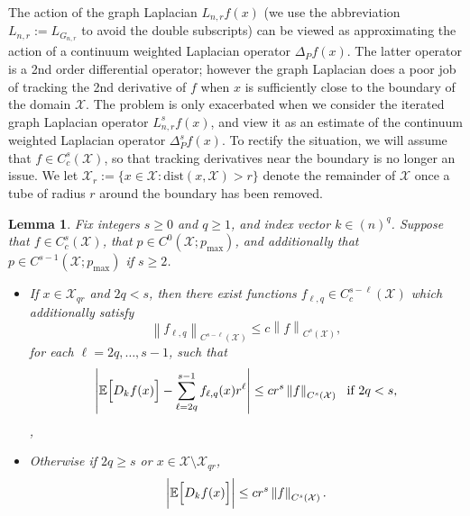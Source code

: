 \documentclass{article}
\newcommand{\abs}[1]{\left \lvert #1 \right \rvert}
\newcommand{\norm}[1]{\left \lVert #1 \right \rVert}
\newcommand{\1}{\mathbf{1}}
\newcommand{\Xset}{\mathcal{X}}
\newcommand{\Ebb}{\mathbb{E}}
\newcommand{\dist}{\mathrm{dist}}
\theoremstyle{alden}
\theoremstyle{aldenthm}
\newtheorem{lemma}{Lemma}
\theoremstyle{definition}
\theoremstyle{remark}
\begin{document}
The action of the graph Laplacian $L_{n,r}f(x)$ (we use the abbreviation $L_{n,r} := L_{G_{n,r}}$ to avoid the double subscripts) can be viewed as approximating the action of a continuum weighted Laplacian operator $\varDelta_Pf(x)$. The latter operator is a 2nd order differential operator; however the graph Laplacian does a poor job of tracking the 2nd derivative of $f$ when $x$ is sufficiently close to the boundary of the domain $\Xset$. The problem is only exacerbated when we consider the iterated graph Laplacian operator $L_{n,r}^sf(x)$, and view it as an estimate of the continuum weighted Laplacian operator $\varDelta_P^sf(x)$. To rectify the situation, we will assume that $f \in C_c^{s}(\Xset)$, so that tracking derivatives near the boundary is no longer an issue. We let $\Xset_r := \{x \in \Xset: \dist(x,\Xset) > r\}$ denote the remainder of $\Xset$ once a tube of radius $r$ around the boundary has been removed.

\begin{lemma}
	\label{lem:leading_term_holder_compact}
	Fix integers $s \geq 0$ and $q \geq 1$, and index vector $k \in (n)^q$. Suppose that $f \in C_c^s(\Xset)$, that $p \in C^0(\Xset;p_{\max})$, and additionally that $p \in C^{s-1}(\Xset;p_{\max})$ if $s \geq 2$. 
	\begin{itemize}
		\item If $x \in \Xset_{qr}$ and $2q < s$, then there exist functions $f_{\ell,q} \in C_c^{s - \ell}(\Xset)$ which additionally satisfy
		\begin{equation}
		\label{eqn:leading_term_holder_compact_0}
		\norm{f_{\ell,q}}_{C^{s - \ell}(\Xset)} \leq c \norm{f}_{C^s(\Xset)},
		\end{equation}
		for each $\ell = 2q,\ldots,s-1$, such that 
		\begin{equation}
		\label{eqn:leading_term_holder_compact_1}
		\abs{\Ebb\Bigl[D_kf(x)\Bigr] -
		\sum_{\ell = 2q}^{s - 1} f_{\ell,q}(x) r^{\ell}} \leq c r^s \norm{f}_{C^s(\Xset)} ~~\textrm{if $2q < s$,}
		\end{equation},
		\item Otherwise if $2q \geq s$ or $x \in \Xset \setminus \Xset_{qr}$,
		\begin{equation}
		\label{eqn:leading_term_holder_compact_2}
		\biggl|\Ebb\Bigl[D_kf(x)\Bigr]\biggr| \leq cr^s\norm{f}_{C^s(\Xset)}.
		\end{equation}
	\end{itemize}
\end{lemma}
\end{document}
